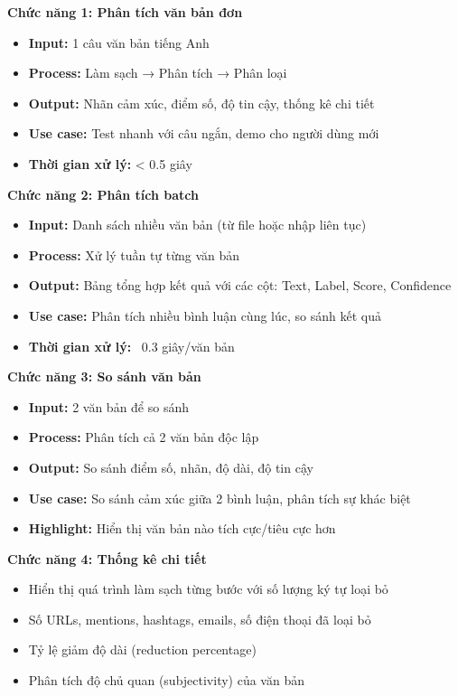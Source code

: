 \textbf{Chức năng 1: Phân tích văn bản đơn}
\begin{itemize}
    \item \textbf{Input:} 1 câu văn bản tiếng Anh
    \item \textbf{Process:} Làm sạch → Phân tích → Phân loại
    \item \textbf{Output:} Nhãn cảm xúc, điểm số, độ tin cậy, thống kê chi tiết
    \item \textbf{Use case:} Test nhanh với câu ngắn, demo cho người dùng mới
    \item \textbf{Thời gian xử lý:} < 0.5 giây
\end{itemize}

\textbf{Chức năng 2: Phân tích batch}
\begin{itemize}
    \item \textbf{Input:} Danh sách nhiều văn bản (từ file hoặc nhập liên tục)
    \item \textbf{Process:} Xử lý tuần tự từng văn bản
    \item \textbf{Output:} Bảng tổng hợp kết quả với các cột: Text, Label, Score, Confidence
    \item \textbf{Use case:} Phân tích nhiều bình luận cùng lúc, so sánh kết quả
    \item \textbf{Thời gian xử lý:} ~0.3 giây/văn bản
\end{itemize}

\textbf{Chức năng 3: So sánh văn bản}
\begin{itemize}
    \item \textbf{Input:} 2 văn bản để so sánh
    \item \textbf{Process:} Phân tích cả 2 văn bản độc lập
    \item \textbf{Output:} So sánh điểm số, nhãn, độ dài, độ tin cậy
    \item \textbf{Use case:} So sánh cảm xúc giữa 2 bình luận, phân tích sự khác biệt
    \item \textbf{Highlight:} Hiển thị văn bản nào tích cực/tiêu cực hơn
\end{itemize}

\textbf{Chức năng 4: Thống kê chi tiết}
\begin{itemize}
    \item Hiển thị quá trình làm sạch từng bước với số lượng ký tự loại bỏ
    \item Số URLs, mentions, hashtags, emails, số điện thoại đã loại bỏ
    \item Tỷ lệ giảm độ dài (reduction percentage)
    \item Phân tích độ chủ quan (subjectivity) của văn bản
\end{itemize}


